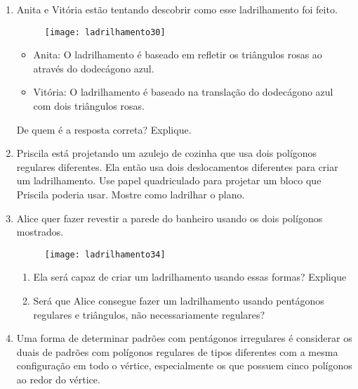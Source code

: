 \begin{enumerate}

	\item Anita e Vitória estão tentando descobrir como esse ladrilhamento foi feito.

	\begin{figure}[H]
	\centering
	\texttt{[image: ladrilhamento30]}

	\end{figure}

	\begin{itemize}
	\item Anita: O ladrilhamento é baseado em refletir os triângulos rosas ao através do dodecágono azul.
	\item Vitória: O ladrilhamento é baseado na translação do dodecágono azul com dois triângulos rosas.
	\end{itemize}

	De quem é a resposta correta? Explique.


	\item Priscila está projetando um azulejo de cozinha que usa dois polígonos regulares diferentes. Ela então usa dois deslocamentos diferentes para criar um ladrilhamento. Use papel quadriculado para projetar um bloco que Priscila poderia usar. Mostre como ladrilhar o plano.

	\item Alice quer fazer revestir a parede do banheiro usando os dois polígonos mostrados.

	\begin{figure}[H]
	\centering
	\texttt{[image: ladrilhamento34]}

	\end{figure}

	\begin{enumerate}
		\item Ela será capaz de criar um ladrilhamento usando essas formas? Explique
\item Será que Alice consegue fazer um ladrilhamento usando pentágonos regulares e triângulos, não necessariamente regulares?
	\end{enumerate}
	
	
	\item Uma forma de determinar padrões com pentágonos irregulares é considerar os duais de padrões com polígonos regulares de tipos diferentes com a mesma configuração em todo o vértice, especialmente os que possuem cinco polígonos ao redor do vértice.


\end{enumerate}
